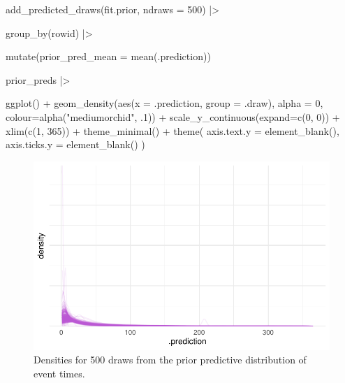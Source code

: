 \documentclass[
  letterpaper,
  DIV=11,
  numbers=noendperiod]{scrreprt}
\newenvironment{Shaded}{\begin{snugshade}}{\end{snugshade}}
\newcommand{\AttributeTok}[1]{\textcolor[rgb]{0.40,0.45,0.13}{#1}}
\newcommand{\DecValTok}[1]{\textcolor[rgb]{0.68,0.00,0.00}{#1}}
\newcommand{\FunctionTok}[1]{\textcolor[rgb]{0.28,0.35,0.67}{#1}}
\newcommand{\NormalTok}[1]{\textcolor[rgb]{0.00,0.23,0.31}{#1}}
\newcommand{\SpecialCharTok}[1]{\textcolor[rgb]{0.37,0.37,0.37}{#1}}
\newcommand{\StringTok}[1]{\textcolor[rgb]{0.13,0.47,0.30}{#1}}
\begin{document}
\begin{Shaded}
\begin{Highlighting}[]
  \FunctionTok{add\_predicted\_draws}\NormalTok{(fit.prior, }\AttributeTok{ndraws =} \DecValTok{500}\NormalTok{) }\SpecialCharTok{|\textgreater{}}

  \FunctionTok{group\_by}\NormalTok{(rowid) }\SpecialCharTok{|\textgreater{}}

  \FunctionTok{mutate}\NormalTok{(}\AttributeTok{prior\_pred\_mean =} \FunctionTok{mean}\NormalTok{(.prediction)) }

\NormalTok{prior\_preds }\SpecialCharTok{|\textgreater{}}

  \FunctionTok{ggplot}\NormalTok{() }\SpecialCharTok{+} 
  \FunctionTok{geom\_density}\NormalTok{(}\FunctionTok{aes}\NormalTok{(}\AttributeTok{x =}\NormalTok{ .prediction, }\AttributeTok{group =}\NormalTok{ .draw), }\AttributeTok{alpha =} \DecValTok{0}\NormalTok{, }\AttributeTok{colour=}\FunctionTok{alpha}\NormalTok{(}\StringTok{"mediumorchid"}\NormalTok{, .}\DecValTok{1}\NormalTok{)) }\SpecialCharTok{+}
  \FunctionTok{scale\_y\_continuous}\NormalTok{(}\AttributeTok{expand=}\FunctionTok{c}\NormalTok{(}\DecValTok{0}\NormalTok{, }\DecValTok{0}\NormalTok{)) }\SpecialCharTok{+}
  \FunctionTok{xlim}\NormalTok{(}\FunctionTok{c}\NormalTok{(}\DecValTok{1}\NormalTok{, }\DecValTok{365}\NormalTok{)) }\SpecialCharTok{+}
  \FunctionTok{theme\_minimal}\NormalTok{() }\SpecialCharTok{+}
  \FunctionTok{theme}\NormalTok{(}
    \AttributeTok{axis.text.y =} \FunctionTok{element\_blank}\NormalTok{(),}
    \AttributeTok{axis.ticks.y =} \FunctionTok{element\_blank}\NormalTok{()}
\NormalTok{  )  }
\end{Highlighting}
\end{Shaded}

\begin{figure}[H]

{\centering \includegraphics{./bayesian-cfa_files/figure-pdf/prior-pred-1-densities-1.pdf}

}

\caption{Densities for 500 draws from the prior predictive distribution
of event times.}

\end{figure}
\end{document}
